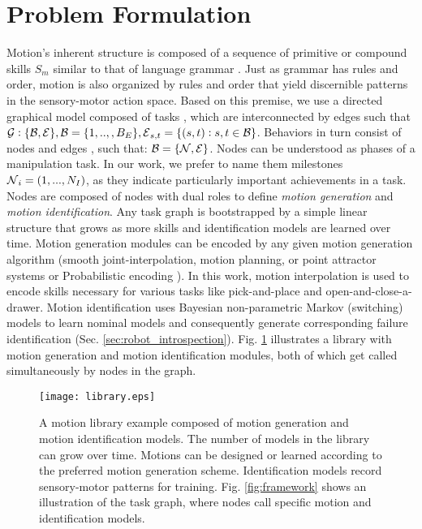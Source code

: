 \documentclass[letterpaper, 10 pt, conference]{ieeeconf}  %
\begin{document}
\section{Problem Formulation} \label{sec:prob_formulation}
Motion's inherent structure is composed of a sequence of primitive or compound skills ${S_m}$ similar to that of language grammar \cite{2017iros-rojas-onlinewrenchintrospection,2015RSS-Kappler-DateDrivenOnlineDecisionMakingManipu,2006CAS-LinHeger-TowardsAutomaticSkillEvaluation:DetectionSegmentationRobotASMotion,2006IEEETBiomedEng-Rosen-GeneralizedApproachModelingMIS_DiscreteMarkov}. Just as grammar has rules and order, motion is also organized by rules and order that yield discernible patterns in the sensory-motor action space. 
Based on this premise, we use a directed graphical model \GC \gap composed of  tasks \BC, which are interconnected by edges \EC\gap such that $\mbox{$\mathcal G$}:\{ \mbox{$\mathcal B$},\mbox{$\mathcal E$} \}, \mbox{$\mathcal B$}=\{1,..,,B_E\}, \mbox{$\mathcal E$}_{s,t}=\{(s,t):s,t\in \mbox{$\mathcal B$}\}$.
Behaviors in turn consist of nodes \NC\gap and edges \EC\gap, such that: $\mbox{$\mathcal B$}=\{ \mbox{$\mathcal N$},\mbox{$\mathcal E$} \}$. Nodes can be understood as phases of a manipulation task. In our work, we prefer to name them milestones $\mbox{$\mathcal N$}_i=(1,...,N_I)$, as they indicate particularly important achievements in a task. Nodes are composed of nodes with dual roles to define \textit{motion generation} and \textit{motion identification}. Any task graph is bootstrapped by a simple linear structure that grows as more skills and identification models are learned over time. Motion generation modules can be encoded by any given motion generation algorithm (smooth joint-interpolation, motion planning, or point attractor systems \cite{2012AutBot-Rojas-AutHetBotAsmbly,2013NC-Ijspeertdynamical-CMP_LrnAttracMdls_MtrBeh} or Probabilistic encoding \cite{2016Arxiv-Meier-ProbabilisticDMPs}). In this work, motion interpolation is used to encode skills necessary for various tasks like pick-and-place and open-and-close-a-drawer. Motion identification uses Bayesian non-parametric Markov (switching) models \cite{2017humanoids-rojas-shdp-var-hmm} to learn nominal models and consequently generate corresponding failure identification (Sec. \ref{sec:robot_introspection}). Fig. \ref{fig:library} illustrates a library with motion generation and motion identification modules, both of which get called simultaneously by nodes in the graph. 
\begin{figure}     
	\centering		
		\texttt{[image: library.eps]}
		\caption{A motion library example composed of motion generation and motion identification models. The number of models in the library can grow over time. Motions can be designed or learned according to the preferred motion generation scheme. Identification models record sensory-motor patterns for training. Fig. \ref{fig:framework} shows an illustration of the task graph, where nodes call specific motion and identification models.}
        \label{fig:library}        
\end{figure}
\end{document}
